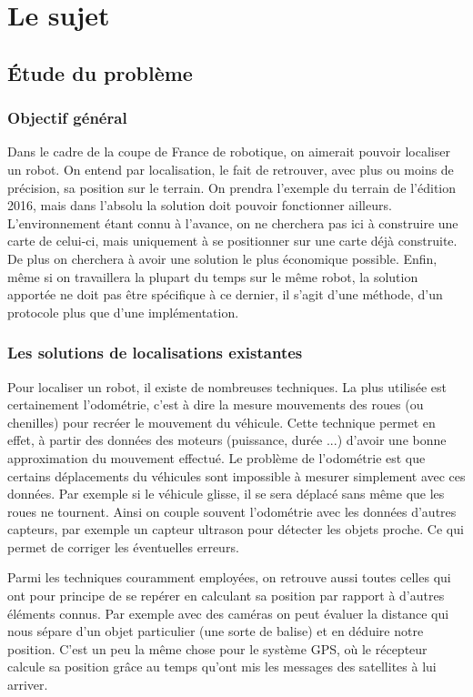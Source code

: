 \documentclass[12pt,a4paper]{report}
\begin{document}
\tableofcontents

\part{Le sujet}
\chapter{Étude du problème}

\section{Objectif général}
Dans le cadre de la coupe de France de robotique, on aimerait pouvoir localiser un robot. On entend par localisation, le fait de retrouver, avec plus ou moins de précision, sa position sur le terrain.
On prendra l'exemple du terrain de l'édition 2016, mais dans l'absolu la solution doit pouvoir fonctionner ailleurs. L'environnement étant connu à l'avance, on ne cherchera pas ici à construire une carte de celui-ci, mais uniquement à se positionner sur une carte déjà construite. De plus on cherchera à avoir une solution le plus économique possible. Enfin, même si on travaillera la plupart du temps sur le même robot, la solution apportée ne doit pas être spécifique à ce dernier, il s'agit d'une méthode, d'un protocole plus que d'une implémentation.

\section{Les solutions de localisations existantes}
Pour localiser un robot, il existe de nombreuses techniques. La plus utilisée est certainement l'odométrie, c'est à dire la mesure mouvements des roues (ou chenilles) pour recréer le mouvement du véhicule. Cette technique permet en effet, à partir des données des moteurs (puissance, durée ...) d'avoir une bonne approximation du mouvement effectué. Le problème de l'odométrie est que certains déplacements du véhicules sont impossible à mesurer simplement avec ces données. Par exemple si le véhicule glisse, il se sera déplacé sans même que les roues ne tournent. Ainsi on couple souvent l'odométrie avec les données d'autres capteurs, par exemple un capteur ultrason pour détecter les objets proche. Ce qui permet de corriger les éventuelles erreurs. 

Parmi les techniques couramment employées, on retrouve aussi toutes celles qui ont pour principe de se repérer en calculant sa position par rapport à d'autres éléments connus. Par exemple avec des caméras on peut évaluer la distance qui nous sépare d'un objet particulier (une sorte de balise) et en déduire notre position. C'est un peu la même chose pour le système GPS, où le récepteur calcule sa position grâce au temps qu'ont mis les messages des satellites à lui arriver.
\end{document}
